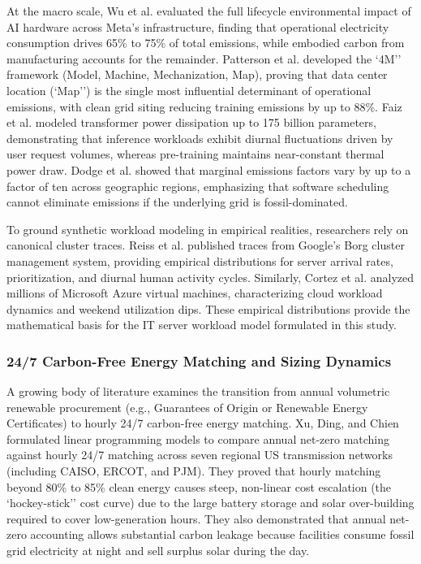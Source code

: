 \documentclass[11pt,a4paper]{article}
\begin{document}
At the macro scale, Wu et al. \cite{Wu2022} evaluated the full lifecycle environmental impact of AI hardware across Meta's infrastructure, finding that operational electricity consumption drives 65\% to 75\% of total emissions, while embodied carbon from manufacturing accounts for the remainder. Patterson et al. \cite{Patterson2021} developed the `4M'' framework (Model, Machine, Mechanization, Map), proving that data center location (`Map'') is the single most influential determinant of operational emissions, with clean grid siting reducing training emissions by up to 88\%. Faiz et al. \cite{Faiz2024} modeled transformer power dissipation up to 175 billion parameters, demonstrating that inference workloads exhibit diurnal fluctuations driven by user request volumes, whereas pre-training maintains near-constant thermal power draw. Dodge et al. \cite{Dodge2022} showed that marginal emissions factors vary by up to a factor of ten across geographic regions, emphasizing that software scheduling cannot eliminate emissions if the underlying grid is fossil-dominated.

To ground synthetic workload modeling in empirical realities, researchers rely on canonical cluster traces. Reiss et al. \cite{Reiss2012} published traces from Google's Borg cluster management system, providing empirical distributions for server arrival rates, prioritization, and diurnal human activity cycles. Similarly, Cortez et al. \cite{Cortez2017} analyzed millions of Microsoft Azure virtual machines, characterizing cloud workload dynamics and weekend utilization dips. These empirical distributions provide the mathematical basis for the IT server workload model formulated in this study.

\subsubsection{24/7 Carbon-Free Energy Matching and Sizing Dynamics}
A growing body of literature examines the transition from annual volumetric renewable procurement (e.g., Guarantees of Origin or Renewable Energy Certificates) to hourly 24/7 carbon-free energy matching. Xu, Ding, and Chien \cite{Xu2024} formulated linear programming models to compare annual net-zero matching against hourly 24/7 matching across seven regional US transmission networks (including CAISO, ERCOT, and PJM). They proved that hourly matching beyond 80\% to 85\% clean energy causes steep, non-linear cost escalation (the `hockey-stick'' cost curve) due to the large battery storage and solar over-building required to cover low-generation hours. They also demonstrated that annual net-zero accounting allows substantial carbon leakage because facilities consume fossil grid electricity at night and sell surplus solar during the day.
\end{document}
